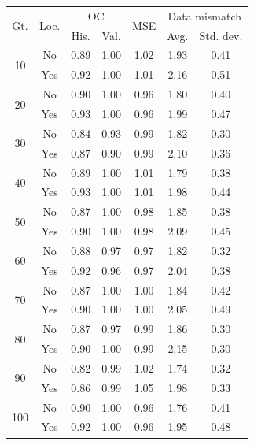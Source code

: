 \begin{tabular}{ccccccc}
\toprule
\multirow{2}{*}{
    Gt.
}
&
\multirow{2}{*}{Loc.} 
& 
\multicolumn{2}{c}{OC} & 
\multirow{2}{*}{
    MSE
} & 
\multicolumn{2}{c}{Data mismatch} 
\\
& & His. & Val. &  & Avg. & Std. dev.
\\
\midrule
\multirow{2}{*}{10} & No & 0.89 & 1.00 & 1.02 & 1.93 & 0.41 \\
 & Yes & 0.92 & 1.00 & 1.01 & 2.16 & 0.51 \\
\midrule
\multirow{2}{*}{20} & No & 0.90 & 1.00 & 0.96 & 1.80 & 0.40 \\
 & Yes & 0.93 & 1.00 & 0.96 & 1.99 & 0.47 \\
\midrule
\multirow{2}{*}{30} & No & 0.84 & 0.93 & 0.99 & 1.82 & 0.30 \\
 & Yes & 0.87 & 0.90 & 0.99 & 2.10 & 0.36 \\
\midrule
\multirow{2}{*}{40} & No & 0.89 & 1.00 & 1.01 & 1.79 & 0.38 \\
 & Yes & 0.93 & 1.00 & 1.01 & 1.98 & 0.44 \\
\midrule
\multirow{2}{*}{50} & No & 0.87 & 1.00 & 0.98 & 1.85 & 0.38 \\
 & Yes & 0.90 & 1.00 & 0.98 & 2.09 & 0.45 \\
\midrule
\multirow{2}{*}{60} & No & 0.88 & 0.97 & 0.97 & 1.82 & 0.32 \\
 & Yes & 0.92 & 0.96 & 0.97 & 2.04 & 0.38 \\
\midrule
\multirow{2}{*}{70} & No & 0.87 & 1.00 & 1.00 & 1.84 & 0.42 \\
 & Yes & 0.90 & 1.00 & 1.00 & 2.05 & 0.49 \\
\midrule
\multirow{2}{*}{80} & No & 0.87 & 0.97 & 0.99 & 1.86 & 0.30 \\
 & Yes & 0.90 & 1.00 & 0.99 & 2.15 & 0.30 \\
\midrule
\multirow{2}{*}{90} & No & 0.82 & 0.99 & 1.02 & 1.74 & 0.32 \\
 & Yes & 0.86 & 0.99 & 1.05 & 1.98 & 0.33 \\
\midrule
\multirow{2}{*}{100} & No & 0.90 & 1.00 & 0.96 & 1.76 & 0.41 \\
 & Yes & 0.92 & 1.00 & 0.96 & 1.95 & 0.48 \\
\bottomrule
\end{tabular}
